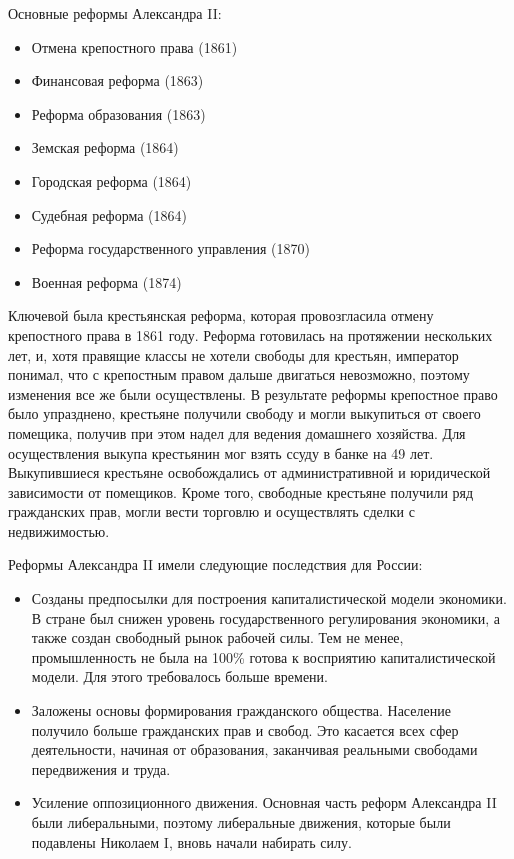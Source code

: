 \documentclass[12pt]{article}
\begin{document}
  Основные реформы Александра II:
  \begin{itemize}[noitemsep,parsep=0pt,partopsep=0pt]
    \item Отмена крепостного права (1861)
    \item Финансовая реформа (1863)
    \item Реформа образования (1863)
    \item Земская реформа (1864)
    \item Городская реформа (1864)
    \item Судебная реформа (1864)
    \item Реформа государственного управления (1870)
    \item Военная реформа (1874)
  \end{itemize}

  Ключевой была крестьянская реформа, которая провозгласила отмену крепостного права в 1861 году.
  Реформа готовилась на протяжении нескольких лет, и, хотя правящие классы не хотели свободы для крестьян,
  император понимал, что с крепостным правом дальше двигаться невозможно, поэтому изменения все же были осуществлены.
  В результате реформы крепостное право было упразднено, крестьяне получили свободу и могли выкупиться от своего помещика,
  получив при этом надел для ведения домашнего хозяйства.
  Для осуществления выкупа крестьянин мог взять ссуду в банке на 49 лет.
  Выкупившиеся крестьяне освобождались от административной и юридической зависимости от помещиков.
  Кроме того, свободные крестьяне получили ряд гражданских прав, могли вести торговлю и осуществлять сделки с недвижимостью.

  Реформы Александра II имели следующие последствия для России:
  \begin{itemize}
    \item
    Созданы предпосылки для построения капиталистической модели экономики.
    В стране был снижен уровень государственного регулирования экономики, а также создан свободный рынок рабочей силы.
    Тем не менее, промышленность не была на 100\% готова к восприятию капиталистической модели.
    Для этого требовалось больше времени.
    \item
    Заложены основы формирования гражданского общества. Население получило больше гражданских прав и свобод.
    Это касается всех сфер деятельности, начиная от образования, заканчивая реальными свободами передвижения и труда.
    \item
    Усиление оппозиционного движения.
    Основная часть реформ Александра II были либеральными, поэтому либеральные движения,
    которые были подавлены Николаем I, вновь начали набирать силу.
  \end{itemize}
\end{document}
